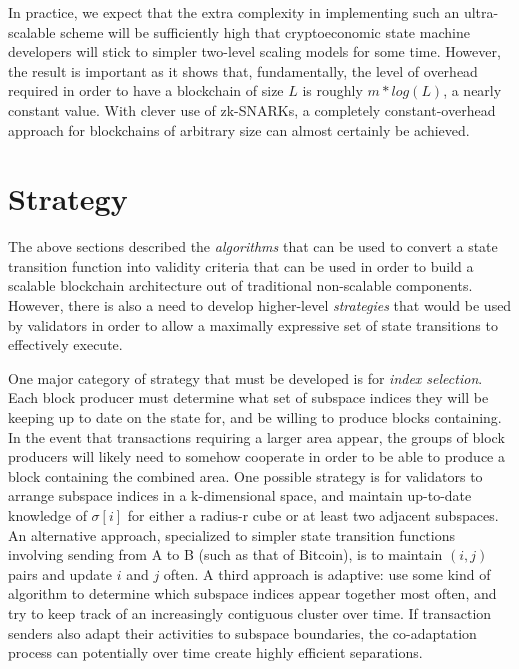 \documentclass[11pt,a4paper]{report}
\theoremstyle{plain}
\theoremstyle{definition}
\theoremstyle{remark}
\begin{document}
In practice, we expect that the extra complexity in implementing such an ultra-scalable scheme will be sufficiently high that cryptoeconomic state machine developers will stick to simpler two-level scaling models for some time. However, the result is important as it shows that, fundamentally, the level of overhead required in order to have a blockchain of size $L$ is roughly $m * log(L)$, a nearly constant value. With clever use of zk-SNARKs, a completely constant-overhead approach for blockchains of arbitrary size can almost certainly be achieved.

\chapter{Strategy}

The above sections described the \emph{algorithms} that can be used to convert a state transition function into validity criteria that can be used in order to build a scalable blockchain architecture out of traditional non-scalable components. However, there is also a need to develop higher-level \emph{strategies} that would be used by validators in order to allow a maximally expressive set of state transitions to effectively execute.

One major category of strategy that must be developed is for \emph{index selection}. Each block producer must determine what set of subspace indices they will be keeping up to date on the state for, and be willing to produce blocks containing. In the event that transactions requiring a larger area appear, the groups of block producers will likely need to somehow cooperate in order to be able to produce a block containing the combined area. One possible strategy is for validators to arrange subspace indices in a k-dimensional space, and maintain up-to-date knowledge of $\sigma[i]$ for either a radius-r cube or at least two adjacent subspaces. An alternative approach, specialized to simpler state transition functions involving sending from A to B (such as that of Bitcoin), is to maintain $(i, j)$ pairs and update $i$ and $j$ often. A third approach is adaptive: use some kind of algorithm to determine which subspace indices appear together most often, and try to keep track of an increasingly contiguous cluster over time. If transaction senders also adapt their activities to subspace boundaries, the co-adaptation process can potentially over time create highly efficient separations.
\end{document}

